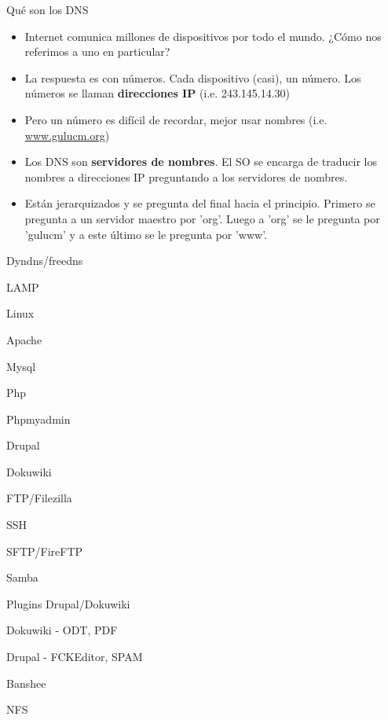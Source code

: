 \documentclass[spanish]{beamer}
\begin{document}
\begin{frame}{Qué son los DNS}
\begin{itemize}
\item Internet comunica millones de dispositivos por todo el mundo. ¿Cómo nos referimos a uno en particular?
\item La respuesta es con números. Cada dispositivo (casi), un número. Los números se llaman {\bf direcciones IP} (i.e. 243.145.14.30)
\item Pero un número es difícil de recordar, mejor usar nombres (i.e. \url{www.gulucm.org})
\item Los DNS son {\bf servidores de nombres}. El SO se encarga de traducir los nombres a direcciones IP preguntando a los servidores de nombres.
\item Están jerarquizados y se pregunta del final hacia el principio. Primero se pregunta a un servidor maestro por 'org'. Luego a 'org' se le pregunta por 'gulucm' y a este último se le pregunta por 'www'.
\end{itemize}
\end{frame}

\begin{frame}{Dyndns/freedns}
\end{frame}
\begin{frame}{LAMP}
\end{frame}
\begin{frame}{Linux}
\end{frame}
\begin{frame}{Apache}
\end{frame}
\begin{frame}{Mysql}
\end{frame}
\begin{frame}{Php}
\end{frame}
\begin{frame}{Phpmyadmin}
\end{frame}
\begin{frame}{Drupal}
\end{frame}
\begin{frame}{Dokuwiki}
\end{frame}
\begin{frame}{FTP/Filezilla}
\end{frame}
\begin{frame}{SSH}
\end{frame}
\begin{frame}{SFTP/FireFTP}
\end{frame}
\begin{frame}{Samba}
\end{frame}
\begin{frame}{Plugins Drupal/Dokuwiki}
\end{frame}
\begin{frame}{Dokuwiki - ODT, PDF}
\end{frame}
\begin{frame}{Drupal - FCKEditor, SPAM}
\end{frame}
\begin{frame}{Banshee}
\end{frame}
\begin{frame}{NFS}
\end{frame}
\end{document}
